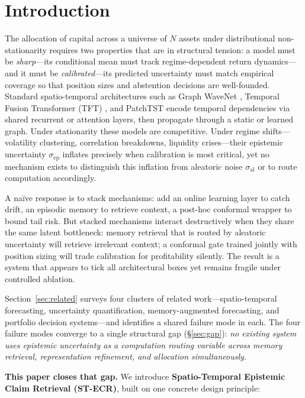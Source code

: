 \documentclass[11pt,a4paper]{article}
\newcommand{\sep}{\sigma_{\mathrm{ep}}}
\newcommand{\sal}{\sigma_{\mathrm{al}}}
\begin{document}
\section{Introduction}
\label{sec:intro}

The allocation of capital across a universe of $N$ assets under distributional
non-stationarity requires two properties that are in structural tension: a model
must be \emph{sharp}—its conditional mean must track regime-dependent return
dynamics—and it must be \emph{calibrated}—its predicted uncertainty must match
empirical coverage so that position sizes and abstention decisions are well-founded.
Standard spatio-temporal architectures such as Graph WaveNet
\citep{wu2019gwn}, Temporal Fusion Transformer (TFT) \citep{lim2021tft}, and
PatchTST \citep{nie2022patchtst} encode temporal dependencies via shared
recurrent or attention layers, then propagate through a static or learned
graph.  Under stationarity these models are competitive.  Under regime
shifts—volatility clustering, correlation breakdowns, liquidity crises—their
epistemic uncertainty $\sep$ inflates precisely when calibration is most critical,
yet no mechanism exists to distinguish this inflation from aleatoric noise
$\sal$ or to route computation accordingly.

A na\"ive response is to stack mechanisms: add an online learning layer to
catch drift, an episodic memory to retrieve context, a post-hoc conformal
wrapper to bound tail risk.  But stacked mechanisms interact destructively
when they share the same latent bottleneck: memory retrieval that is routed by
aleatoric uncertainty will retrieve irrelevant context; a conformal gate trained
jointly with position sizing will trade calibration for profitability silently.
The result is a system that appears to tick all architectural boxes yet remains
fragile under controlled ablation.

Section~\ref{sec:related} surveys four clusters of related work—spatio-temporal
forecasting, uncertainty quantification, memory-augmented forecasting, and
portfolio decision systems—and identifies a shared failure mode in each.
The four failure modes converge to a single structural gap
(\S\ref{sec:gap}): \emph{no existing system uses epistemic uncertainty as a
computation routing variable across memory retrieval, representation
refinement, and allocation simultaneously.}

\textbf{This paper closes that gap.}  We introduce
\textbf{Spatio-Temporal Epistemic Claim Retrieval (ST-ECR)}, built on one
concrete design principle:
\end{document}
